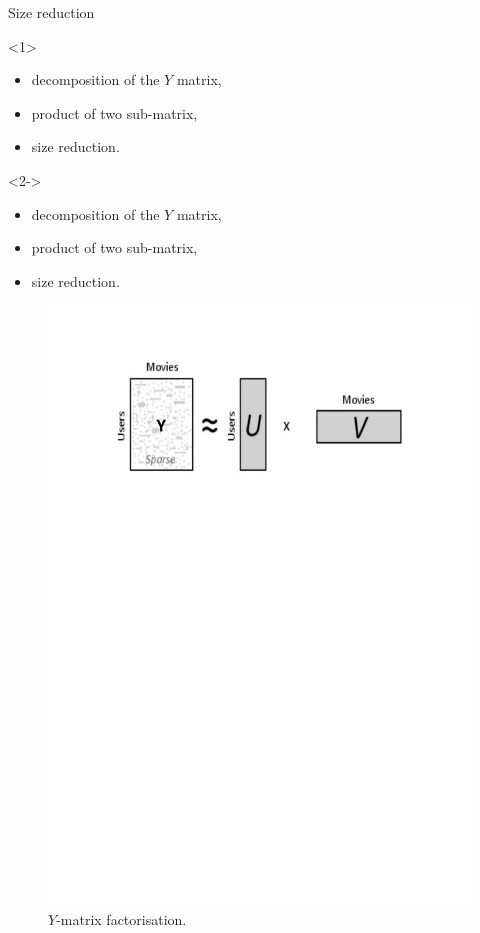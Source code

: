 \documentclass[unknownkeysallowed]{beamer}
\begin{document}
\begin{frame}{Size reduction}
\begin{onlyenv}<1>
\begin{itemize}
    \item decomposition of the $Y$ matrix, 
    \item product of two sub-matrix, 
    \item size reduction.
\end{itemize}
\end{onlyenv}
\begin{onlyenv}<2->
\begin{itemize}
    \item decomposition of the $Y$ matrix, 
    \item product of two sub-matrix, 
    \item size reduction.
\end{itemize}
    \begin{figure}[H]
\centering
  \includegraphics[scale=0.4]{./images/facto.pdf}
  \caption{$Y$-matrix factorisation.}
  \label{fig:facto}
\end{figure}
\end{onlyenv}
\end{frame}
\end{document}
